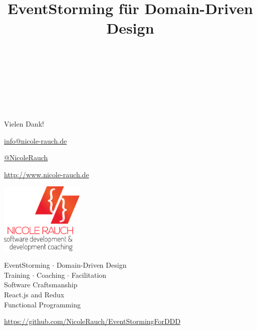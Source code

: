 \documentclass[utf8]{beamer}
\author{~}
\title{EventStorming für Domain-Driven Design}
\subtitle{~}
\institute{~}
\date{~}
\begin{document}
{
	\usebackgroundtemplate{} %
	\begin{frame}[t,plain]
		\titlepage
	\end{frame}
}


\begin{frame}{Vielen Dank!}

\vspace{-2em}

\noindent\begin{minipage}[t]{\linewidth}

\begin{minipage}[b]{.58\linewidth}
  \begin{block}{}
    \begin{description}[Twitterxx]
    \item[E-Mail]  \href{mailto:info@nicole-rauch.de}{\textsf{info@nicole-rauch.de}}
    \item[Twitter] \href{http://twitter.com/NicoleRauch}{\textsf{@NicoleRauch}}
    \item[Web] \href{http://www.nicole-rauch.de}{\textsf{http://www.nicole-rauch.de}}
    \end{description}
  \end{block}
\end{minipage}
\hfill
\begin{minipage}[b]{0.38\linewidth}
\includegraphics[width=4cm]{./logos/Nicole.png}
\vspace{.9em}
\end{minipage}

\end{minipage}

\vspace{2em}

\begin{minipage}[t]{\linewidth}

\begin{center}
EventStorming $\cdot$ Domain-Driven Design \\
Training $\cdot$ Coaching $\cdot$ Facilitation \\
Software Craftsmanship \\ 
React.js and Redux  \\
Functional Programming
\end{center}  

\begin{center}
                \url{https://github.com/NicoleRauch/EventStormingForDDD}
\end{center}

\end{minipage}

\end{frame}


\end{document}
